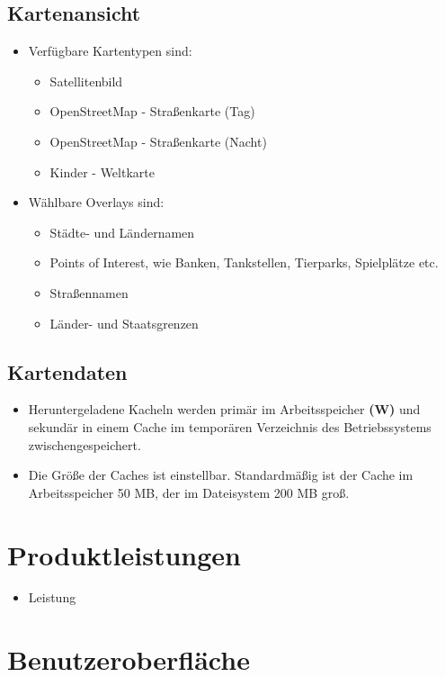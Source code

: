 \documentclass[10pt]{scrreprt}
\begin{document}
\section{Kartenansicht}
\begin{itemize}
\item Verfügbare Kartentypen sind:
\begin{itemize}
\item Satellitenbild
\item OpenStreetMap - Straßenkarte (Tag)
\item OpenStreetMap - Straßenkarte (Nacht)
\item Kinder - Weltkarte
\end{itemize}
\item Wählbare Overlays sind:
\begin{itemize}
\item Städte- und Ländernamen
\item Points of Interest, wie Banken, Tankstellen, Tierparks, Spielplätze etc.
\item Straßennamen
\item Länder- und Staatsgrenzen
\end{itemize}
\end{itemize}
\section{Kartendaten}
\begin{itemize}
\item Heruntergeladene Kacheln werden primär im Arbeitsspeicher \textbf{(W)} und sekundär in einem Cache im temporären Verzeichnis des Betriebssystems zwischengespeichert.
\item Die Größe der Caches ist einstellbar. Standardmäßig ist der Cache im Arbeitsspeicher 50 MB, der im Dateisystem 200 MB groß.
\end{itemize}




\chapter{Produktleistungen}
\begin{itemize}
\item Leistung
\end{itemize}




\chapter{Benutzeroberfläche}
\end{document}
